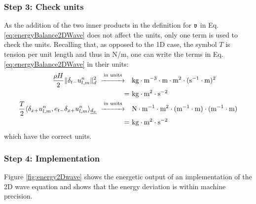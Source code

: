 \subsubsection{Step 3: Check units}
As the addition of the two inner products in the definition for $\mathfrak{v}$ in Eq. \eqref{eq:energyBalance2DWave} does not affect the units, only one term is used to check the units. Recalling that, as opposed to the 1D case, the symbol $T$ is tension per unit length and thus in N/m, one can write the terms in Eq. \eqref{eq:energyBalance2DWave} in their units:
\begin{align*}
    \frac{\rho H}{2}\lVert \delta_{t-} u_{l,m}^n\rVert^2_d \
    \overset{\text{in units}}{\xrightarrow{\hspace*{1cm}}}    \quad&\text{kg}\cdot\text{m}^{-3}\cdot\text{m}\cdot\text{m}^2\cdot(\text{s}^{-1}\cdot\text{m})^2 \\
    = \ & \text{kg}\cdot\text{m}^2\cdot\text{s}^{-2}\\
    \frac{T}{2} \langle \delta_{x+} u_{l,m}^n, e_{t-}\delta_{x+} u_{l,m}^n\rangle_{\underline{d_x}} \
    \overset{\text{in units}}{\xrightarrow{\hspace*{1cm}}}    \quad& \text{N} \cdot \text{m}^{-1}\cdot\text{m}^2\cdot(\text{m}^{-1}\cdot\text{m})\cdot(\text{m}^{-1}\cdot\text{m})\nonumber \\
    = \ &\text{kg}\cdot\text{m}^2\cdot\text{s}^{-2}
\end{align*}
which have the correct units. 

\subsubsection{Step 4: Implementation}
Figure \ref{fig:energy2Dwave} shows the energetic output of an implementation of the 2D wave equation and shows that the energy deviation is within machine precision.

